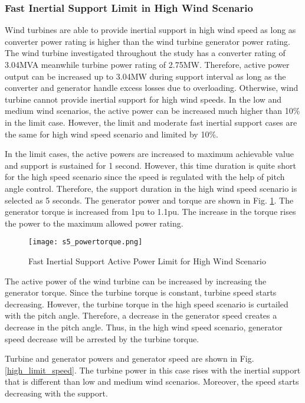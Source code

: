 \subsubsection{Fast Inertial Support Limit in High Wind Scenario}
Wind turbines are able to provide inertial support in high wind speed as long as converter power rating is higher than the wind turbine generator power rating. The wind turbine investigated throughout the study has a converter rating of 3.04MVA meanwhile turbine power rating of 2.75MW. Therefore, active power output can be increased up to 3.04MW during support interval as long as the converter and generator handle excess losses due to overloading. Otherwise, wind turbine cannot provide inertial support for high wind speeds. In the low and medium wind scenarios, the active power can be increased much higher than 10\% in the limit case. However, the limit and moderate fast inertial support cases are the same for high wind speed scenario and limited by 10\%.\par
In the limit cases, the active powers are increased to maximum achievable value and support is sustained for 1 second. However, this time duration is quite short for the high speed scenario since the speed is regulated with the help of pitch angle control. Therefore, the support duration in the high wind speed scenario is selected as 5 seconds. The generator power and torque are shown in Fig. \ref{high_powers}. The generator torque is increased from 1pu to 1.1pu. The increase in the torque rises the power to the maximum allowed power rating. \par
\begin{figure}[h]
	\centering
	\texttt{[image: s5\_powertorque.png]}
	\caption{Fast Inertial Support Active Power Limit for High Wind Scenario}
	\label{high_powers}
\end{figure}
The active power of the wind turbine can be increased by increasing the generator torque. Since the turbine torque is constant, turbine speed starts decreasing. However, the turbine torque in the high speed scenario is curtailed with the pitch angle. Therefore, a decrease in the generator speed creates a decrease in the pitch angle. Thus, in the high wind speed scenario, generator speed decrease will be arrested by the turbine torque. \par
Turbine and generator powers and generator speed are shown in Fig. \ref{high_limit_speed}. The
turbine power in this case rises with the inertial support that is different than low
and medium wind scenarios. Moreover, the speed starts decreasing with the support.
